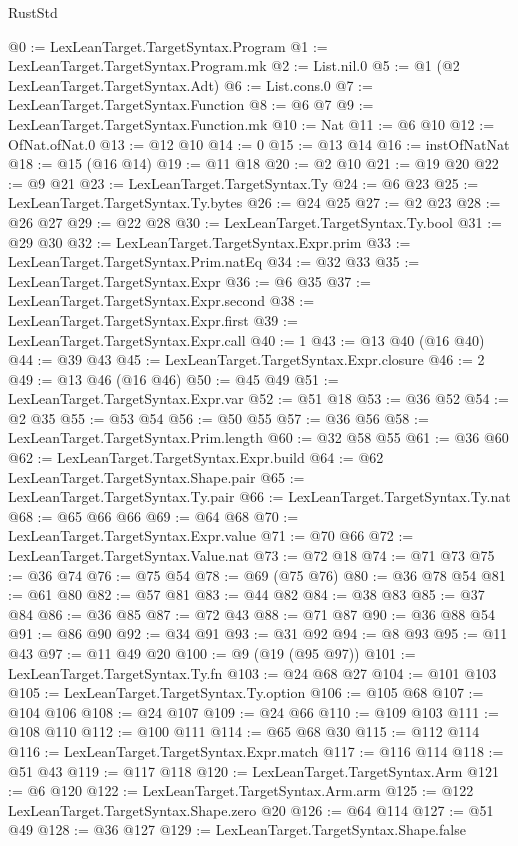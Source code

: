 \begin{lexlean}{RustStd}
\begin{coremodule}
{\begin{coremodule}
{{{{{{{{{{{{{@0 := LexLeanTarget.TargetSyntax.Program
@1 := LexLeanTarget.TargetSyntax.Program.mk
@2 := List.nil.{0}
@5 := @1 (@2 LexLeanTarget.TargetSyntax.Adt)
@6 := List.cons.{0}
@7 := LexLeanTarget.TargetSyntax.Function
@8 := @6 @7
@9 := LexLeanTarget.TargetSyntax.Function.mk
@10 := Nat
@11 := @6 @10
@12 := OfNat.ofNat.{0}
@13 := @12 @10
@14 := 0
@15 := @13 @14
@16 := instOfNatNat
@18 := @15 (@16 @14)
@19 := @11 @18
@20 := @2 @10
@21 := @19 @20
@22 := @9 @21
@23 := LexLeanTarget.TargetSyntax.Ty
@24 := @6 @23
@25 := LexLeanTarget.TargetSyntax.Ty.bytes
@26 := @24 @25
@27 := @2 @23
@28 := @26 @27
@29 := @22 @28
@30 := LexLeanTarget.TargetSyntax.Ty.bool
@31 := @29 @30
@32 := LexLeanTarget.TargetSyntax.Expr.prim
@33 := LexLeanTarget.TargetSyntax.Prim.natEq
@34 := @32 @33
@35 := LexLeanTarget.TargetSyntax.Expr
@36 := @6 @35
@37 := LexLeanTarget.TargetSyntax.Expr.second
@38 := LexLeanTarget.TargetSyntax.Expr.first
@39 := LexLeanTarget.TargetSyntax.Expr.call
@40 := 1
@43 := @13 @40 (@16 @40)
@44 := @39 @43
@45 := LexLeanTarget.TargetSyntax.Expr.closure
@46 := 2
@49 := @13 @46 (@16 @46)
@50 := @45 @49
@51 := LexLeanTarget.TargetSyntax.Expr.var
@52 := @51 @18
@53 := @36 @52
@54 := @2 @35
@55 := @53 @54
@56 := @50 @55
@57 := @36 @56
@58 := LexLeanTarget.TargetSyntax.Prim.length
@60 := @32 @58 @55
@61 := @36 @60
@62 := LexLeanTarget.TargetSyntax.Expr.build
@64 := @62 LexLeanTarget.TargetSyntax.Shape.pair
@65 := LexLeanTarget.TargetSyntax.Ty.pair
@66 := LexLeanTarget.TargetSyntax.Ty.nat
@68 := @65 @66 @66
@69 := @64 @68
@70 := LexLeanTarget.TargetSyntax.Expr.value
@71 := @70 @66
@72 := LexLeanTarget.TargetSyntax.Value.nat
@73 := @72 @18
@74 := @71 @73
@75 := @36 @74
@76 := @75 @54
@78 := @69 (@75 @76)
@80 := @36 @78 @54
@81 := @61 @80
@82 := @57 @81
@83 := @44 @82
@84 := @38 @83
@85 := @37 @84
@86 := @36 @85
@87 := @72 @43
@88 := @71 @87
@90 := @36 @88 @54
@91 := @86 @90
@92 := @34 @91
@93 := @31 @92
@94 := @8 @93
@95 := @11 @43
@97 := @11 @49 @20
@100 := @9 (@19 (@95 @97))
@101 := LexLeanTarget.TargetSyntax.Ty.fn
@103 := @24 @68 @27
@104 := @101 @103
@105 := LexLeanTarget.TargetSyntax.Ty.option
@106 := @105 @68
@107 := @104 @106
@108 := @24 @107
@109 := @24 @66
@110 := @109 @103
@111 := @108 @110
@112 := @100 @111
@114 := @65 @68 @30
@115 := @112 @114
@116 := LexLeanTarget.TargetSyntax.Expr.match
@117 := @116 @114
@118 := @51 @43
@119 := @117 @118
@120 := LexLeanTarget.TargetSyntax.Arm
@121 := @6 @120
@122 := LexLeanTarget.TargetSyntax.Arm.arm
@125 := @122 LexLeanTarget.TargetSyntax.Shape.zero @20
@126 := @64 @114
@127 := @51 @49
@128 := @36 @127
@129 := LexLeanTarget.TargetSyntax.Shape.false
}}}}}}}}}}}}}
\end{coremodule}}
\end{coremodule}
\end{lexlean}
